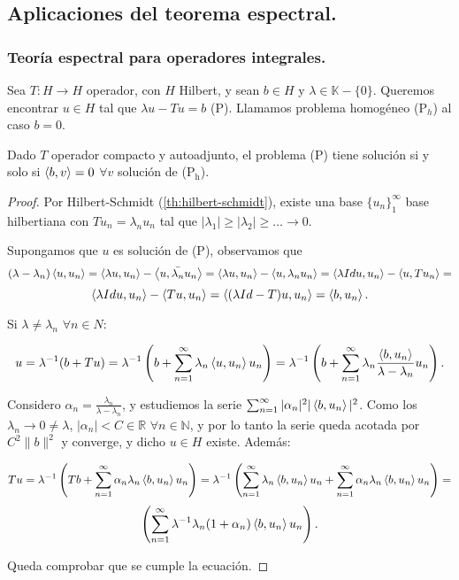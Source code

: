 \subsection{Aplicaciones del teorema espectral.}

\subsubsection{Teoría espectral para operadores integrales.}

\begin{definition}
  Sea $T:H\to H$ operador, con $H$ Hilbert, y sean $b\in H$ y $\lambda\in
  \mathbb{K}-\{0\} $. Queremos encontrar $u\in H$ tal que $\lambda u-Tu=b$ (P).
  Llamamos problema homogéneo (P$_h$) al caso $b=0$.
\end{definition}

\begin{theorem}
  \label{th:fredholm}
  Dado $T$ operador compacto y autoadjunto, el problema (P) tiene solución si y
  solo si  $\left\langle b,v\right\rangle=0$ $\forall v$ solución de (P$_{\text{h}}$).
\end{theorem}

\begin{proof}
  Por Hilbert-Schmidt (\ref{th:hilbert-schmidt}), existe una base
  $\{u_n\}_1^\infty$ base hilbertiana con $Tu_n=\lambda_n u_n$ tal que
  $|\lambda_1|\ge |\lambda_2|\ge \ldots \to 0$.


  Supongamos que $u$ es solución de (P), observamos que
  \[
  (\lambda-\lambda_n)\left\langle u,u_n\right\rangle =
  \left\langle\lambda u,u_n\right\rangle - \left\langle u,\bar{\lambda_n} u_n\right\rangle =
  \left\langle\lambda u,u_n\right\rangle - \left\langle u,\lambda_n u_n\right\rangle =
  \left\langle\lambda Id u,u_n\right\rangle - \left\langle u,Tu_n\right\rangle =
  \] 
  \[
  \left\langle\lambda Id u,u_n\right\rangle - \left\langle Tu,u_n\right\rangle=
  \left\langle(\lambda Id - T) u,u_n\right\rangle=
  \left\langle b,u_n\right\rangle
  .\] 

  Si $\lambda\neq \lambda_n$ $\forall n\in N$:

  \[
  u=\lambda^{-1}(b+Tu)=
  \lambda^{-1}\left(b+\sum_{n=1}^{\infty} \lambda_n\left\langle u,u_n\right\rangle u_n\right)=
  \lambda^{-1}\left(b+\sum_{n=1}^{\infty}
  \lambda_n\frac{\left\langle b,u_n\right\rangle}{\lambda-\lambda_n}u_n\right)
  .\] 

  Considero $\alpha_n=\frac{\lambda_n}{\lambda-\lambda_n}$, y estudiemos la
  serie $\sum_{n=1}^{\infty} |\alpha_n|^2|\left\langle b,u_n\right\rangle|^2$. Como los
  $\lambda_n\to 0\neq \lambda$, $|\alpha_n|<C\in \mathbb{R}$ $\forall n\in
  \mathbb{N}$, y por lo tanto la serie queda acotada por $C^2\|b\|^2$ y
  converge, y dicho $u\in H$ existe. Además:

  \[
  Tu=
  \lambda^{-1}\left( Tb+\sum_{n=1}^{\infty} \alpha_n \lambda_n \left\langle b,u_n\right\rangle u_n \right)=
  \lambda^{-1}\left( \sum_{n=1}^{\infty} \lambda_n \left\langle b,u_n\right\rangle u_n +
                     \sum_{n=1}^{\infty} \alpha_n \lambda_n \left\langle b,u_n\right\rangle u_n \right)=
  \]
  \[
  \left( \sum_{n=1}^{\infty} \lambda^{-1}\lambda_n(1+\alpha_n) \left\langle b,u_n\right\rangle u_n
  \right)
  .\] 

  Queda comprobar que se cumple la ecuación.

\end{proof}


